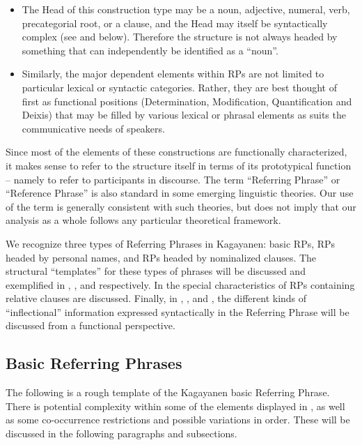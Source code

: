 \begin{itemize}
\item The Head of this construction type may be a noun, adjective, numeral, verb, precategorial root, or a clause, and the Head may itself be syntactically complex (see  and  below). Therefore the structure is not always headed by something that can independently be identified as a “noun”.
\item
Similarly, the major dependent elements within RPs are not limited to particular lexical or syntactic categories. Rather, they are best thought of first as functional positions (Determination, Modification, Quantification and Deixis) that may be filled by various lexical or phrasal elements as suits the communicative needs of speakers.
\end{itemize}

Since most of the elements of these constructions are functionally characterized, it makes sense to refer to the structure itself in terms of its prototypical function – namely to refer to participants in discourse. The term “Referring Phrase” or “Reference Phrase” \citep{vanvalin2006} is also standard in some emerging linguistic theories. Our use of the term is generally consistent with such theories, but does not imply that our analysis as a whole follows any particular theoretical framework.

We recognize three types of Referring Phrases in Kagayanen: basic RPs, RPs headed by personal names, and RPs headed by nominalized clauses. The structural “templates” for these types of phrases will be discussed and exemplified in , , and  respectively. In  the special characteristics of RPs containing relative clauses are discussed. Finally, in , , and , the different kinds of “inflectional” information expressed syntactically in the Referring Phrase will be discussed from a functional perspective.

\subsection{Basic Referring Phrases}
\label{sec:basicreferringphrases}

The following is a rough template of the Kagayanen basic Referring Phrase. There is potential complexity within some of the elements displayed in , as well as some co-occurrence restrictions and possible variations in order. These will be discussed in the following paragraphs and subsections.

